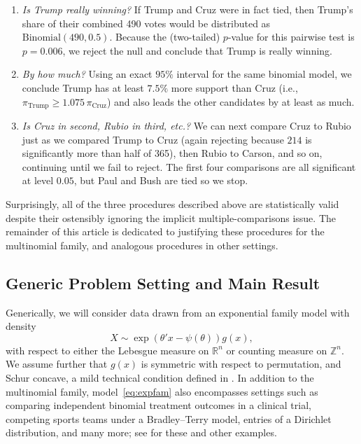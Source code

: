 \documentclass[11pt]{article}
\theoremstyle{definition}
\theoremstyle{custom}
\newcommand{\RR}{\mathbb{R}}
\newcommand{\ZZ}{\mathbb{Z}}
\begin{document}
\begin{enumerate}
\item {\em Is Trump really winning?} If Trump and Cruz were in fact tied, then Trump's share of their combined 490 votes would be distributed as $\text{Binomial}\left(490, 0.5\right)$. Because the (two-tailed) $p$-value for this pairwise test is $p = 0.006$, we reject the null and conclude that Trump is really winning.

\item {\em By how much?} Using an exact $95\%$ interval for the same binomial model, we conclude Trump has at least $7.5\%$ more support than Cruz (i.e., $\pi_{\text{Trump}} \ge 1.075 \,\pi_{\text{Cruz}}$) and also leads the other candidates by at least as much.

\item {\em Is Cruz in second, Rubio in third, etc.?} We can next compare Cruz to Rubio just as we compared Trump to Cruz (again rejecting because $214$ is significantly more than half of 365), then Rubio to Carson, and so on, continuing until we fail to reject. The first four comparisons are all significant at level $0.05$, but Paul and Bush are tied so we stop.
\end{enumerate}

Surprisingly, all of the three procedures described above are statistically valid despite their ostensibly ignoring the implicit multiple-comparisons issue. The remainder of this article is dedicated to justifying these procedures for the multinomial family, and analogous procedures in other settings.

\subsection{Generic Problem Setting and Main Result}
\label{sec:probset}

Generically, we will consider data drawn from an exponential family model with density
\begin{equation}
X \sim \exp\left(\theta'x - \psi\left(\theta\right)\right) g\left(x\right),
\label{eq:expfam}
\end{equation}
with respect to either the Lebesgue measure on $\RR^n$ or counting measure on $\ZZ^n$. We assume further that $g\left(x\right)$ is symmetric with respect to permutation, and Schur concave, a mild technical condition defined in . In addition to the multinomial family, model~\eqref{eq:expfam} also encompasses settings such as comparing independent binomial treatment outcomes in a clinical trial, competing sports teams under a Bradley--Terry model, entries of a Dirichlet distribution, and many more; see  for these and other examples.
\end{document}
